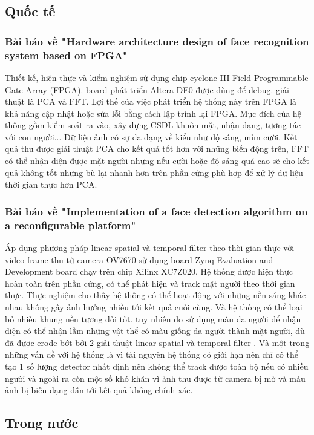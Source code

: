 \documentclass[a4paper]{report}
\begin{document}
\subsection{Quốc tế}
\subsubsection*{Bài báo về "Hardware architecture design of face recognition system based on FPGA" \cite{ctquocte1}}
Thiết kế, hiện thực và kiểm nghiệm sử dụng chip cyclone III Field Programmable Gate Array (FPGA). board phát triển Altera DE0 được dùng để debug. giải thuật là PCA và FFT. Lợi thế của việc phát triển hệ thống này trên FPGA là khả năng cập nhật hoặc sửa lỗi bằng cách lập trình lại FPGA. Mục đích của hệ thống gồm kiểm soát ra vào, xây dựng CSDL khuôn mặt, nhận dạng, tương tác với con người... Dữ liệu ảnh có sự đa dạng về kiểu như độ sáng, mỉm cười. Kết quả thu được giải thuật PCA cho kết quả tốt hơn với những biến động trên, FFT có thể nhận diện được mặt người nhưng nếu cười hoặc độ sáng quá cao sẽ cho kết quả không tốt nhưng bù lại nhanh hơn trên phần cứng phù hợp để xử lý dữ liệu thời gian thực hơn PCA.
\subsubsection*{Bài báo về "Implementation of a face detection algorithm on a reconfigurable platform" \cite{ctquocte2}}
Áp dụng phương pháp linear spatial và temporal filter theo thời gian thực với video frame thu từ camera OV7670 sử dụng board Zynq Evaluation and Development board chạy trên chip Xilinx XC7Z020. Hệ thống được hiện thực hoàn toàn trên phần cứng, có thể phát hiện và track mặt người theo thời gian thực. Thực nghiệm cho thấy hệ thống có thể hoạt động với những nền sáng khác nhau không gây ảnh hưởng nhiều tới kết quả cuối cùng. Và hệ thống có thể loại bỏ nhiễu khung nền  tương đối tốt. tuy nhiên do sử dụng màu da người để nhận diện có thể nhận lầm những vật thể có màu giống da người thành mặt người, dù đã được erode bớt bởi 2 giải thuật linear spatial và temporal filter . Và một trong những vấn đề với hệ thống là vì tài nguyên hệ thống có giới hạn nên chỉ có thể tạo 1 số lượng detector nhất định nên không thể track được toàn bộ nếu có nhiều người và ngoài ra còn một số khó khăn vì ảnh thu được từ camera bị mờ và màu ảnh bị biến dạng dẫn tới kết quả không chính xác.
\subsection{Trong nước}
\end{document}
